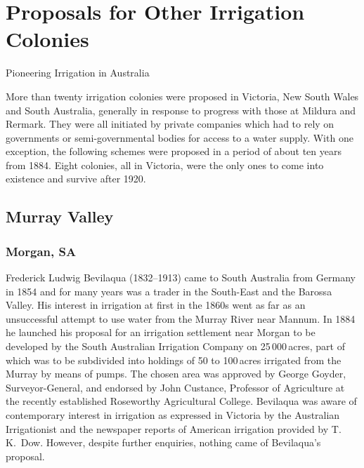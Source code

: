 
\setcounter{endnote}{0}

\chapter{Proposals for Other Irrigation Colonies}
\label{ch:proposals}
%
{Pioneering Irrigation in Australia}

More than twenty irrigation colonies were proposed in Victoria, New
South Wales and South Australia, generally in response to progress
with those at Mildura and Rermark.  They were all initiated by private
companies which had to rely on governments or semi-governmental bodies
for access to a water supply. With one exception, the following
schemes were proposed in a period of about ten years from 1884.  Eight
colonies, all in Victoria, were the only ones to come into existence
and survive after 1920.

\section*{Murray Valley}

\subsection*{Morgan, SA} 

Frederick Ludwig Bevilaqua (1832--1913)  came
to South Australia from Germany in 1854 and for many years was a
trader in the South-East and the Barossa
Valley.  His interest in irrigation at first in
the 1860s went as far as an unsuccessful attempt to use water from the
Murray River  near Mannum.  In 1884
he launched his proposal for an irrigation settlement near Morgan to
be developed by the South Australian Irrigation Company  on 25\,000\,acres, part of which was to be subdivided
into holdings of 50 to 100\,acres irrigated from the Murray by means of
pumps.  The chosen area was approved by George Goyder,
Surveyor-General,   and endorsed by John Custance,
 Professor of Agriculture at the recently
established Roseworthy Agricultural College.  Bevilaqua was aware of contemporary interest
in irrigation as expressed in Victoria by the Australian Irrigationist
and the newspaper reports of American irrigation provided by
T.\,K.~Dow.  However, despite further enquiries,
nothing came of Bevilaqua's proposal.

